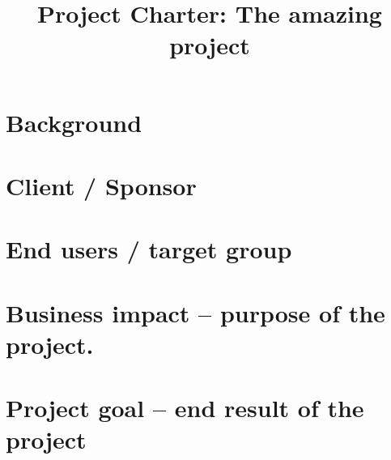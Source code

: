 \documentclass[10pt]{projectdoc}
\title{Project Charter: The amazing project}
\begin{document}
\maketitle
\thispagestyle{fancy}
\section{Background}
\vspace{3cm} %
\section{Client / Sponsor}
\vspace{3cm} %
\section{End users / target group}
\vspace{3cm} %
\section{Business impact – purpose of the project.}
\vspace{3cm} %
\section{Project goal – end result of the project}
\vspace{3cm} %
\infotable

\end{document}
